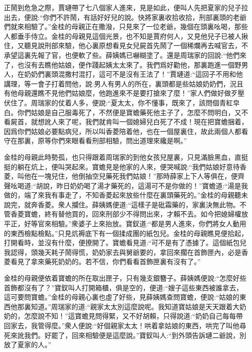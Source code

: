 \begin{parag}
    正鬧到危急之際，賈璉帶了七八個家人進來，見是如此，便叫人先把夏家的兒子拉出去，便說:“你們不許鬧，有話好好兒的說。快將家裏收拾收拾，刑部裏頭的老爺們就來相驗了。”金桂的母親正在撒潑，只見來了一位老爺，幾個在頭裏吆喝，那些人都垂手侍立。金桂的母親見這個光景，也不知是賈府何人，又見他兒子已被人揪住，又聽見說刑部來驗，他心裏原想看見女兒屍首先鬧了一個稀爛再去喊官去，不承望這裏先報了官，也便軟了些。薛姨媽已嚇糊塗了。還是周瑞家的回說:“他們來了，也沒有去瞧他姑娘，便作踐起姨太太來了。我們爲好勸他，那裏跑進一個野男人，在奶奶們裏頭混撒村混打，這可不是沒有王法了！”賈璉道:“這回子不用和他講理，等一會子打着問他，說:男人有男人的所在，裏頭都是些姑娘奶奶們，況且有他母親還瞧不見他們姑娘麼，他跑進來不是要打搶來了麼！”家人們做好做歹壓伏住了。周瑞家的仗着人多，便說:“夏太太，你不懂事，既來了，該問個青紅皁白。你們姑娘是自己服毒死了，不然便是寶蟾藥死他主子了，怎麼不問明白，又不看屍首，就想訛人來了呢，我們就肯叫一個媳婦兒白死了不成！現在把寶蟾捆着，因爲你們姑娘必要點病兒，所以叫香菱陪着他，也在一個屋裏住，故此兩個人都看守在那裏，原等你們來眼看看刑部相驗，問出道理來纔是啊。”
\end{parag}


\begin{parag}
    金桂的母親此時勢孤，也只得跟着周瑞家的到他女孩兒屋裏，只見滿臉黑血，直挺挺的躺在炕上，便叫哭起來。寶蟾見是他家的人來，便哭喊說:“我們姑娘好意待香菱，叫他在一塊兒住，他倒抽空兒藥死我們姑娘！”那時薛家上下人等俱在，便齊聲吆喝道:“胡說，昨日奶奶喝了湯才藥死的，這湯可不是你做的！”寶蟾道:“湯是我做的，端了來我有事走了，不知香菱起來放些什麼在裏頭藥死的。”金桂的母親聽未說完，就奔香菱。衆人攔住。薛姨媽便道:“這樣子是砒霜藥的，家裏決無此物。不管香菱寶蟾，終有替他買的，回來刑部少不得問出來，才賴不去。如今把媳婦權放平正，好等官來相驗。”衆婆子上來抬放。寶釵道:“都是男人進來，你們將女人動用的東西檢點檢點。”只見炕褥底下有一個揉成團的紙包兒。金桂的母親瞧見便拾起，打開看時，並沒有什麼，便撩開了。寶蟾看見道:“可不是有了憑據了。這個紙包兒我認得，頭幾天耗子鬧得慌，奶奶家去與舅爺要的，拿回來擱在首飾匣內，必是香菱看見了拿來藥死奶奶的。若不信，你們看看首飾匣裏有沒有了。”
\end{parag}


\begin{parag}
    金桂的母親便依着寶蟾的所在取出匣子，只有幾支銀簪子。薛姨媽便說:“怎麼好些首飾都沒有了？”寶釵叫人打開箱櫃，俱是空的，便道:“嫂子這些東西被誰拿去，這可要問寶蟾。”金桂的母親心裏也虛了好些，見薛姨媽查問寶蟾，便說:“姑娘的東西他那裏知道。”周瑞家的道:“親家太太別這麼說呢。我知道寶姑娘是天天跟着大奶奶的，怎麼說不知！”這寶蟾見問得緊，又不好胡賴，只得說道:“奶奶自己每每帶回家去，我管得麼。”衆人便說:“好個親家太太！哄着拿姑娘的東西，哄完了叫他尋死來訛我們。好罷了，回來相驗便是這麼說。”寶釵叫人:“到外頭告訴璉二爺說，別放了夏家的人。”
\end{parag}


